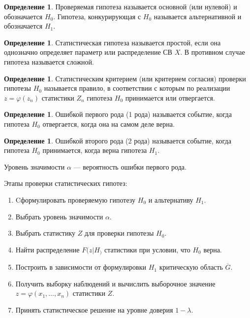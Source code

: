 \documentclass[12pt]{report}
\theoremstyle{definition}
\newtheorem{definition}[theorem]{Определение}
\begin{document}
\begin{definition}
Проверяемая гипотеза называется основной (или нулевой)
и обозначается $H_0$. Гипотеза, конкурирующая с $H_0$
называется альтернативной и обозначается $H_1$.
\end{definition}

\begin{definition}
Статистическая гипотеза называется простой, если она однозначно
определяет параметр или распределение СВ $X$. В противном случае
гипотеза называется сложной.
\end{definition}

\begin{definition}
Статистическим критерием (или критерием согласия) проверки гипотезы
$H_0$ называется правило, в соответствии с которым по реализации
$z = \varphi(z_n)$ статистики $Z_n$ гипотеза $H_0$ принимается или
отвергается. 
\end{definition}

\begin{definition}
Ошибкой первого рода (1 рода) называется событие, когда гипотеза
$H_0$ отвергается, когда она на самом деле верна.
\end{definition}

\begin{definition}
Ошибкой второго рода (2 рода) называется событие, когда гипотеза
$H_0$ принимается, когда верна гипотеза $H_1$.
\end{definition}

Уровень значимости $\alpha$ --- вероятность ошибки первого рода.

Этапы проверки статистических гипотез:
\begin{enumerate}
\item Cформулировать проверяемую гипотезу $H_0$ и альтернативу $H_1$.
\item Выбрать уровень значимости $\alpha$.
\item Выбрать статистику $Z$ для проверки гипотезы $H_0$.
\item Найти распределение $F(z|H_)$ статистики при условии, что
  $H_0$ верна.
\item Построить в зависимости от формулировки $H_1$ критическую область
  $\overline{G}$.
\item Получить выборку наблюдений и вычислить выборочное значение
  $z = \varphi(x_1, \dots, x_n)$ статистики $Z$.
\item Принять статистическое решение на уровне доверия $1 - \lambda$.
\end{enumerate}
\end{document}
